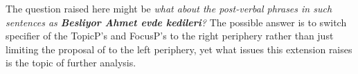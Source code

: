 \documentclass[11pt,a4paper]{article}
\begin{document}
\noindent The question raised here might be \emph{what about the post-verbal phrases in such sentences as \textbf{Besliyor Ahmet evde kedileri}?} The possible answer is to switch specifier of the TopicP's and FocusP's to the right periphery rather than just limiting the proposal of \textcite{rizzi} to the left periphery, yet what issues this extension raises is the topic of further analysis.
\printbibliography
\end{document}
